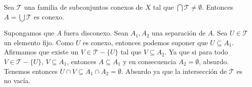 \begin{afirmacion}\label{inte-conex-R}
Sea $\mathcal{T}$ una familia de subconjuntos conexos de $X$ tal que $\bigcap \mathcal{T} \neq \emptyset$. Entonces $A=\bigcup \mathcal{T} $ es conexo.
\end{afirmacion}
\begin{prueba}
 Supongamos que $A$ fuera disconexo. Sean $A_1, A_2$ una separación de $A$. Sea $U\in \mathcal{T}$ un elemento fijo. Como $U$ es conexo, entonces podemos suponer que $U\subseteq A_1$. Afirmamos que existe un $V\in \mathcal{T}-\{U\}$ tal que $V\subseteq A_2$. Ya que si para todo  $V\in \mathcal{T}-\{U\}$, $V \subseteq A_1$, entonces $A \subseteq A_1$ y en consecuencia $A_2 = \emptyset$, absurdo. Tenemos entonces $U\cap V \subseteq A_1 \cap A_2=\emptyset$.  Absurdo ya que la intersección de $\mathcal{T}$ es no vacía.
\end{prueba}

\newpage